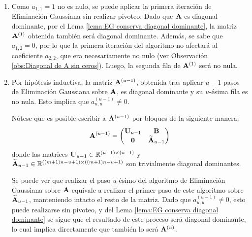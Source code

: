         \begin{enumerate}[label=(\roman*)]
            \item {} Como $a_{1,1} = 1$ no es nulo, se puede aplicar la primera iteración de Eliminación Gaussiana sin realizar pivoteo. Dado que $\mathbf{A}$ es diagonal dominante, por el Lema \ref{lema:EG conserva diagonal dominante}, la matriz $\mathbf{A}^{(1)}$ obtenida también será diagonal dominante. Además, se sabe que $a_{1,2} = 0$, por lo que la primera iteración del algoritmo no afectará al coeficiente $a_{2,2}$, que era necesariamente no nulo (ver Observación \ref{obs:Diagonal de A sin ceros}). Luego, la segunda fila de $\mathbf{A}^{(1)}$ será no nula.

            \item {} Por hipótesis inductiva, la matriz $\mathbf{A}^{(u-1)}$, obtenida tras aplicar $u-1$ pasos de Eliminación Gaussiana sobre $\mathbf{A}$, es diagonal dominante y su $u$-ésima fila es no nula. Esto implica que $a^{(u-1)}_{u,u} \neq 0$.

            Nótese que es posible escribir a $\mathbf{A}^{(u-1)}$ por bloques de la siguiente manera:
            \[ \mathbf{A}^{(u-1)} = \left( \begin{matrix} \mathbf{U}_{u-1} & \mathbf{B} \\ \mathbf{0} & \widetilde{\mathbf{A}}_{u-1} \end{matrix} \right) \]
            donde las matrices $\mathbf{U}_{u-1} \in \mathbb{R}^{(u-1)\times(u-1)}$ y $\widetilde{\mathbf{A}}_{u-1} \in \mathbb{R}^{((m+1)n-u+1)\times((m+1)n-u+1)}$ son trivialmente diagonal dominantes.

            Se puede ver que realizar el paso $u$-ésimo del algoritmo de Eliminación Gaussiana sobre $\mathbf{A}$ equivale a realizar el primer paso de este algoritmo sobre $\widetilde{\mathbf{A}}_{u-1}$, manteniendo intacto el resto de la matriz. Dado que $a^{(u-1)}_{u,u} \neq 0$, esto puede realizarse sin pivoteo, y del Lema \ref{lema:EG conserva diagonal dominante} se sigue que el resultado de este proceso será diagonal dominante, lo cual implica directamente que también lo será $\mathbf{A}^{(u)}$.


\end{enumerate}
